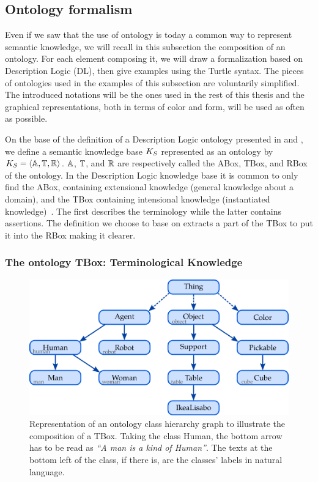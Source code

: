 \subsection{Ontology formalism}
\label{sec:kb_formalism}

Even if we saw that the use of ontology is today a common way to represent semantic knowledge, we will recall in this subsection the composition of an ontology. For each element composing it, we will draw a formalization based on Description Logic (DL), then give examples using the Turtle syntax. The pieces of ontologies used in the examples of this subsection are voluntarily simplified. The introduced notations will be the ones used in the rest of this thesis and the graphical representations, both in terms of color and form, will be used as often as possible.

On the base of the definition of a Description Logic ontology presented in \cite{fokoue_2006_summary} and \cite{krotzsch_2013_description}, we define a semantic knowledge base $K_S$ represented as an ontology by  $K_S = \langle \mathbb{A}, \mathbb{T}, \mathbb{R} \rangle$. $\mathbb{A}$, $\mathbb{T}$, and $\mathbb{R}$ are respectively called the ABox, TBox, and RBox of the ontology. In the Description Logic knowledge base it is common to only find the ABox, containing extensional knowledge (general knowledge about a domain), and the TBox containing intensional knowledge (instantiated knowledge)~\cite{baader_2003_description}. The first describes the terminology while the latter contains assertions. The definition we choose to base on extracts a part of the TBox to put it into the RBox making it clearer.

\subsubsection{The ontology TBox: Terminological Knowledge}

\begin{figure}[ht!]
\centering
\includegraphics[scale=0.4]{figures/chapter2/Tbox.png}
\caption{\label{fig:Tbox} Representation of an ontology class hierarchy graph to illustrate the composition of a TBox. Taking the class Human, the bottom arrow has to be read as \textit{``A man is a kind of Human''}. The texts at the bottom left of the class, if there is, are the classes' labels in natural language.}
\end{figure}

